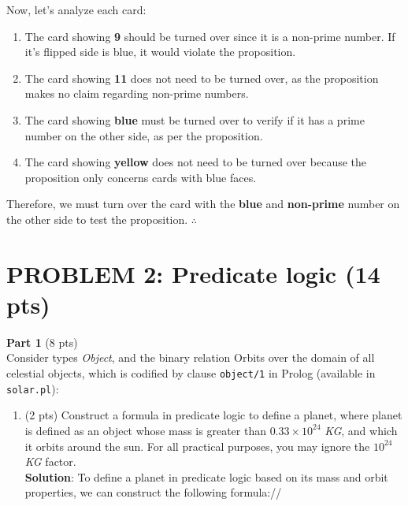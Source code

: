 \documentclass[12pt]{article}
\begin{document}
\begin{spacing}{1.5}
	Now, let's analyze each card:
	\begin{enumerate}
		\item The card showing \textbf{9} should be turned over since it is a non-prime number. If it's flipped side is blue, it would violate the proposition.
		\item The card showing \textbf{11} does not need to be turned over, as the proposition makes no claim regarding non-prime numbers.
		\item The card showing \textbf{blue} must be turned over to verify if it has a prime number on the other side, as per the proposition.
		\item The card showing \textbf{yellow} does not need to be turned over because the proposition only concerns cards with blue faces.\\
	\end{enumerate}
										
	Therefore, we must turn over the card with the \textbf{blue} and \textbf{non-prime} number on the other side to test the proposition. $\therefore$
										
	\newpage
										
						
	\newpage
					    
	\section*{PROBLEM 2: Predicate logic (14 pts)}
										
	\textbf{Part 1} (8 pts)\\
	Consider types \textit{Object}, and the binary relation Orbits over the domain of all celestial objects,
	which is codified by clause \texttt{object/1} in Prolog (available in \texttt{solar.pl}):
									
	\begin{enumerate}
		\item 
		      (2 pts) Construct a formula in predicate logic to define a planet, where planet is defined
		      as an object whose mass is greater than $0.33\times10^{24}$ \textit{KG}, and which it orbits around the
		      sun. For all practical purposes, you may ignore the $10^{24}$ \textit{KG} factor.\\
		      		      		      		      		      		      		      		      
		      \textbf{Solution}: To define a planet in predicate logic based on its mass and orbit properties, we can construct the following formula://
		      		      		      		      		      		      		      		      

\end{enumerate}
\end{spacing}
\end{document}
